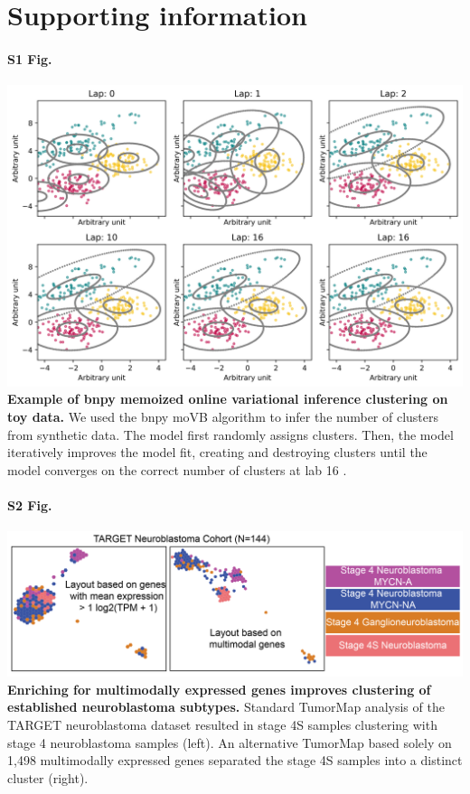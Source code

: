 \documentclass[10pt,letterpaper]{article}
\begin{document}
\section*{Supporting information}

\paragraph*{S1 Fig.}
\includegraphics[width=\textwidth]{img/PNG/cluster-over-time}
\label{S1_Fig}
{\bf Example of bnpy memoized online variational inference clustering on toy data.} We used the bnpy moVB algorithm to infer the number of clusters from synthetic data. The model first randomly assigns clusters. Then, the model iteratively improves the model fit, creating and destroying clusters until the model converges on the correct number of clusters at lab 16 \cite{hughesBnpyReliableScalable}.

\paragraph*{S2 Fig.}
\includegraphics[width=\textwidth]{img/PNG/TumorMap-NBL-MM-V2-2x}
\label{S2_Fig}
{\bf Enriching for multimodally expressed genes improves clustering of established neuroblastoma subtypes.} Standard TumorMap analysis of the TARGET neuroblastoma dataset resulted in stage 4S samples clustering with stage 4 neuroblastoma samples (left). An alternative TumorMap based solely on 1,498 multimodally expressed genes separated the stage 4S samples into a distinct cluster (right).
\end{document}
